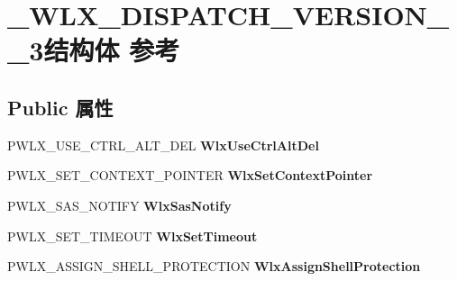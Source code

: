 \hypertarget{struct___w_l_x___d_i_s_p_a_t_c_h___v_e_r_s_i_o_n__1__3}{}\section{\+\_\+\+W\+L\+X\+\_\+\+D\+I\+S\+P\+A\+T\+C\+H\+\_\+\+V\+E\+R\+S\+I\+O\+N\+\_\+\_\+3结构体 参考}
\label{struct___w_l_x___d_i_s_p_a_t_c_h___v_e_r_s_i_o_n__1__3}
\subsection*{Public 属性}
\begin{DoxyCompactItemize}
\item 
\mbox{\label{struct___w_l_x___d_i_s_p_a_t_c_h___v_e_r_s_i_o_n__1__3_a9f213d08b05ac4a26cd8bea7adc00c44}} 
P\+W\+L\+X\+\_\+\+U\+S\+E\+\_\+\+C\+T\+R\+L\+\_\+\+A\+L\+T\+\_\+\+D\+EL {\bfseries Wlx\+Use\+Ctrl\+Alt\+Del}
\item 
\mbox{\label{struct___w_l_x___d_i_s_p_a_t_c_h___v_e_r_s_i_o_n__1__3_afe857cc62aa973fc90c0932622552ad1}} 
P\+W\+L\+X\+\_\+\+S\+E\+T\+\_\+\+C\+O\+N\+T\+E\+X\+T\+\_\+\+P\+O\+I\+N\+T\+ER {\bfseries Wlx\+Set\+Context\+Pointer}
\item 
\mbox{\label{struct___w_l_x___d_i_s_p_a_t_c_h___v_e_r_s_i_o_n__1__3_a3edd04be4a8e5f9c2ebe4bfc04997f4f}} 
P\+W\+L\+X\+\_\+\+S\+A\+S\+\_\+\+N\+O\+T\+I\+FY {\bfseries Wlx\+Sas\+Notify}
\item 
\mbox{\label{struct___w_l_x___d_i_s_p_a_t_c_h___v_e_r_s_i_o_n__1__3_a1d31a304630ec2eae184487ca23906db}} 
P\+W\+L\+X\+\_\+\+S\+E\+T\+\_\+\+T\+I\+M\+E\+O\+UT {\bfseries Wlx\+Set\+Timeout}
\item 
\mbox{\label{struct___w_l_x___d_i_s_p_a_t_c_h___v_e_r_s_i_o_n__1__3_a1a1ec7e75bf436acdf6fd18ecc97b398}} 
P\+W\+L\+X\+\_\+\+A\+S\+S\+I\+G\+N\+\_\+\+S\+H\+E\+L\+L\+\_\+\+P\+R\+O\+T\+E\+C\+T\+I\+ON {\bfseries Wlx\+Assign\+Shell\+Protection}

\end{DoxyCompactItemize}
